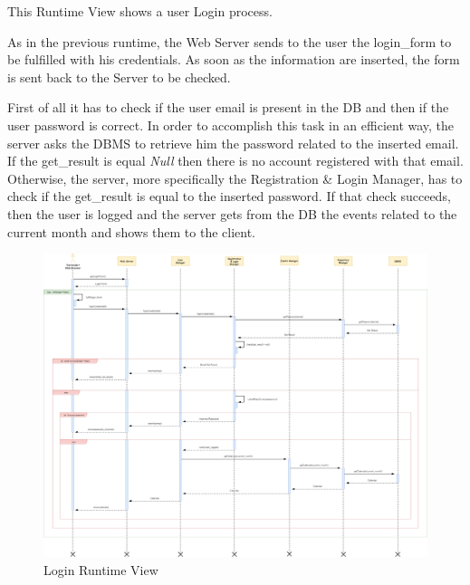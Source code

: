 \newpage
{}
This Runtime View shows a user Login process.\par
As in the previous runtime, the Web Server sends to the user the login\_form to be fulfilled with his credentials. As soon as the information are inserted, the form is sent back to the Server to be checked.\par
First of all it has to check if the user email is present in the DB and then if the user password is correct. In order to accomplish this task in an efficient way, the server asks the DBMS to retrieve him the password related to the inserted email. If the get\_result is equal \emph{Null} then there is no account registered with that email. Otherwise, the server, more specifically the Registration \& Login Manager, has to check if the get\_result is equal to the inserted password.
If that check succeeds, then the user is logged and the server gets from the DB the events related to the current month and shows them to the client.
\begin{figure}[H]
	\centering
	\includegraphics[scale=0.17]{Images/Runtime/Login}
	\caption{Login Runtime View}
\end{figure}

